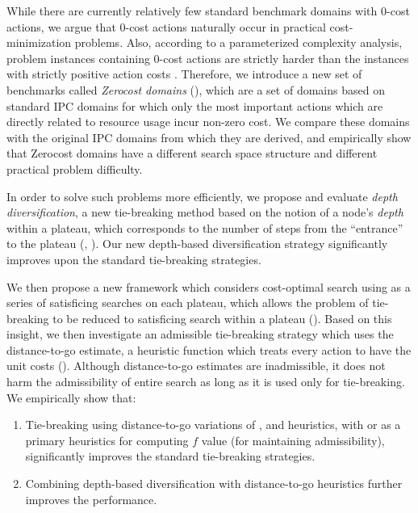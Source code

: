 While there are currently relatively few standard benchmark domains with 0-cost actions,
we argue that 0-cost actions naturally occur in
practical cost-minimization problems.
Also, according to a parameterized complexity analysis, problem instances containing 0-cost actions are strictly harder than the instances with strictly positive action costs \cite{aghighi2015}.
Therefore, we introduce a new set of benchmarks called \emph{Zerocost domains}
(), which are a set of domains based on standard IPC domains for which only the most important actions which are directly related to resource usage incur non-zero cost.
We compare these domains with the original IPC domains from which they are derived, and empirically show that 
Zerocost domains have a different search space structure and different practical problem difficulty.

In order to solve such problems more efficiently, we propose and
evaluate \emph{depth diversification}, a new
tie-breaking method based on the notion of a node's \emph{depth} within a plateau,
which corresponds to the number of steps from the ``entrance'' to
the plateau (,
). 
Our new depth-based diversification strategy significantly improves upon the 
standard tie-breaking strategies.

We then propose a new framework which considers cost-optimal search using \astar 
as a series of satisficing searches on each plateau,
which allows the problem of tie-breaking to be reduced to satisficing search within a plateau ().
Based on this insight, we then investigate an
admissible tie-breaking strategy which uses the distance-to-go estimate, a heuristic function which treats every action
to have the unit costs ().
Although distance-to-go estimates are inadmissible,
it does not harm the admissibility of entire search as long as it is used only for tie-breaking.
% 
We empirically show that:
\begin{enumerate}
 \item Tie-breaking using distance-to-go variations of \lmcut, \mands and \ff heuristics,
       with \lmcut or \mands as a primary heuristics for computing $f$ value (for maintaining admissibility),
       significantly improves the standard tie-breaking strategies.
 \item Combining depth-based diversification with distance-to-go heuristics 
       further improves the performance.
\end{enumerate}

